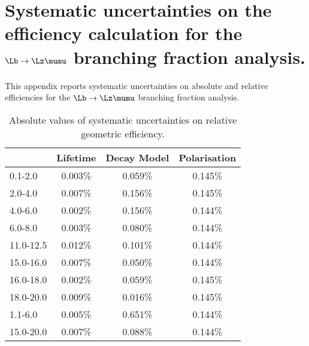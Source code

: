 \chapter{Systematic uncertainties on the efficiency calculation for the $\Lb\to\Lz\mumu$
branching fraction analysis.}
\label{app:Lb_systematics}

This appendix reports systematic uncertainties on absolute and relative 
efficiencies for the $\Lb\to\Lz\mumu$ branching fraction analysis.


\begin{table}
\centering
\begin{tabular}{l|ccc} 
\qsq [\gevgevcccc]	 & Lifetime  & Decay Model   & Polarisation  \\ \hline
0.1-2.0  	 & 0.003\% 	 & 0.059\% 	 & 0.145\% 	 \\ 
2.0-4.0  	 & 0.007\% 	 & 0.156\% 	 & 0.145\% 	 \\ 
4.0-6.0  	 & 0.002\% 	 & 0.156\% 	 & 0.144\% 	 \\ 
6.0-8.0      & 0.003\%   & 0.080\%   & 0.144\%   \\
11.0-12.5  	 & 0.012\% 	 & 0.101\% 	 & 0.144\% 	 \\ 
15.0-16.0  	 & 0.007\% 	 & 0.050\% 	 & 0.144\% 	 \\ 
16.0-18.0  	 & 0.002\% 	 & 0.059\% 	 & 0.145\% 	 \\ 
18.0-20.0  	 & 0.009\% 	 & 0.016\% 	 & 0.145\% 	 \\ 
 \hline
1.1-6.0  	 & 0.005\% 	 & 0.651\% 	 & 0.144\% 	 \\ 
15.0-20.0  	 & 0.007\% 	 & 0.088\% 	 & 0.144\% 	 \\ 
\end{tabular}
\caption{Absolute values of systematic uncertainties on relative geometric efficiency.}
\label{tab:relativeGeomSys}
\end{table}

